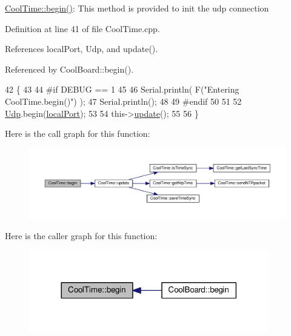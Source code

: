 \hyperlink{classCoolTime_ab1976cf718b950bc31e003c3323b8adb}{Cool\+Time\+::begin()}\+: This method is provided to init the udp connection 

Definition at line 41 of file Cool\+Time.\+cpp.



References local\+Port, Udp, and update().



Referenced by Cool\+Board\+::begin().


\begin{DoxyCode}
42 \{
43 
44 \textcolor{preprocessor}{#if DEBUG == 1 }
45 
46     Serial.println( F(\textcolor{stringliteral}{"Entering CoolTime.begin()"}) );
47     Serial.println();
48 
49 \textcolor{preprocessor}{#endif }
50 
51 
52     \hyperlink{classCoolTime_a4e23216a8121ca79d0fb019f30884b92}{Udp}.begin(\hyperlink{classCoolTime_a2f777da44d7ba678be8185299e9b49d1}{localPort});
53     
54     this->\hyperlink{classCoolTime_aae601f795452cfa48d9fb337aed483a8}{update}();
55     
56 \}
\end{DoxyCode}
Here is the call graph for this function\+:\nopagebreak
\begin{figure}[H]
\begin{center}
\leavevmode
\includegraphics[width=350pt]{classCoolTime_ab1976cf718b950bc31e003c3323b8adb_cgraph}
\end{center}
\end{figure}
Here is the caller graph for this function\+:\nopagebreak
\begin{figure}[H]
\begin{center}
\leavevmode
\includegraphics[width=296pt]{classCoolTime_ab1976cf718b950bc31e003c3323b8adb_icgraph}
\end{center}
\end{figure}
\mbox{\label{classCoolTime_a87c28260c1bc77091162cbcf1ee2e129}} 

